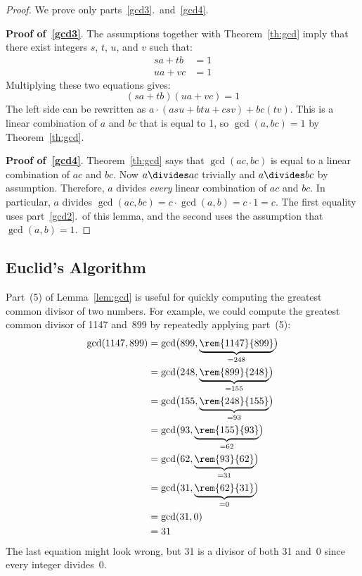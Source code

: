 \begin{proof}
We prove only parts~\ref{gcd3}.\ and~\ref{gcd4}.

\textbf{Proof of~\ref{gcd3}}.  The assumptions together with Theorem~\ref{th:gcd} imply
that there exist integers $s$, $t$, $u$, and $v$ such that:
%
\begin{align*}
s a + t b & = 1 \\
u a + v c & = 1
\end{align*}
%
Multiplying these two equations gives:
\[
(s a + t b)(u a + v c) = 1
\]
%
The left side can be rewritten as $a \cdot (a s u + b t u + c s v) + b c
(t v)$.  This is a linear combination of $a$ and $b c$ that is equal to 1,
so $\gcd(a, bc) = 1$ by Theorem~\ref{th:gcd}.

\textbf{Proof of~\ref{gcd4}}.  Theorem~\ref{th:gcd} says that $\gcd(ac, bc)$ is equal to a
linear combination of $ac$ and $bc$.  Now $a \divides ac$ trivially
and $a
\divides bc$ by assumption.  Therefore, $a$ divides \emph{every} linear
combination of $ac$ and $bc$.  In particular, $a$ divides $\gcd(ac, bc) =
c \cdot \gcd(a, b) = c\cdot 1 = c$.  The first equality uses part~\ref{gcd2}.\ of
this lemma, and the second uses the assumption that $\gcd(a, b) = 1$.
\end{proof}

\subsection{Euclid's Algorithm}

Part~(5) of Lemma~\ref{lem:gcd} is useful for quickly computing the
greatest common divisor of two numbers.  For example, we could compute
the greatest common divisor of 1147 and~899 by repeatedly applying
part~(5):
\begin{align*}
\gcd(1147, 899)
    &= \gcd\bigl(899, \underbrace{\rem{1147}{899}}_{{} = 248}\bigr) \\
    &= \gcd\bigl(248, \underbrace{\rem{899}{248}}_{{} = 155}\bigr) \\
    &= \gcd\bigl(155, \underbrace{\rem{248}{155}}_{{} = 93}\bigr) \\
    &= \gcd\bigl(93,  \underbrace{\rem{155}{93}}_{{} = 62}\bigr) \\
    &= \gcd\bigl(62,  \underbrace{\rem{93}{62}}_{{} = 31}\bigr) \\
    &= \gcd\bigl(31,  \underbrace{\rem{62}{31}}_{{} = 0}\bigr) \\
    &= \gcd(31, 0) \\
    &= 31
\end{align*}
The last equation might look wrong, but 31 is a divisor of both 31
and~0 since every integer divides~0.

